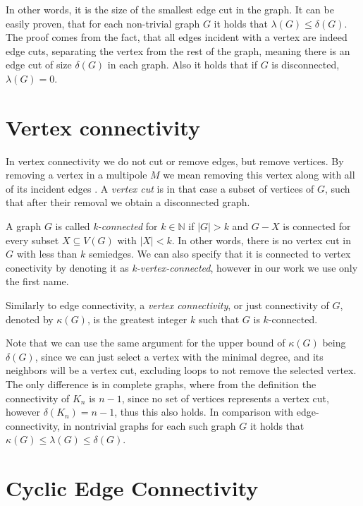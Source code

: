 \documentclass[12pt, twoside]{book}
\begin{document}
In other words, it is the size of the smallest edge cut in the graph. It can be easily proven, that for each non-trivial graph $G$ it holds that $\lambda(G)\leq\delta(G)$. The proof comes from the fact, that all edges incident with a vertex are indeed edge cuts, separating the vertex from the rest of the graph, meaning there is an edge cut of size $\delta(G)$ in each graph. Also it holds that if $G$ is disconnected, $\lambda(G)=0$.

\section{Vertex connectivity}

In vertex connectivity we do not cut or remove edges, but remove vertices. By removing a vertex in a multipole $M$ we mean removing this vertex along with all of its incident edges . A \textit{vertex cut} is in that case a subset of vertices of $G$, such that after their removal we obtain a disconnected graph.

A graph $G$ is called \textit{k-connected} for $k\in\mathbb{N}$ if $|G|>k$ and $G-X$ is connected for every subset $X\subseteq V(G)$ with $|X|<k$. In other words, there is no vertex cut in $G$ with less than $k$ semiedges. We can also specify that it is connected to vertex conectivity by denoting it as \textit{k-vertex-connected}, however in our work we use only the first name.

Similarly to edge connectivity, a \textit{vertex connectivity}, or just connectivity of $G$, denoted by $\kappa(G)$, is the greatest integer $k$ such that $G$ is $k$-connected.

Note that we can use the same argument for the upper bound of $\kappa(G)$ being $\delta(G)$, since we can just select a vertex with the minimal degree, and its neighbors will be a vertex cut, excluding loops to not remove the selected vertex. The only difference is in complete graphs, where from the definition the connectivity of $K_n$ is $n-1$, since no set of vertices represents a vertex cut, however $\delta(K_n)=n-1$, thus this also holds. In comparison with edge-connectivity, in nontrivial graphs for each such graph $G$ it holds that $\kappa(G)\leq \lambda(G) \leq \delta(G)$.

\section{Cyclic Edge Connectivity}\label{sec:cyclic-edge-connectivity}
\end{document}
